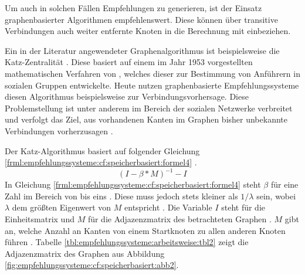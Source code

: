 Um auch in solchen Fällen Empfehlungen zu generieren, ist der Einsatz graphenbasierter Algorithmen empfehlenswert. Diese können über transitive Verbindungen auch weiter entfernte Knoten in die Berechnung mit einbeziehen. \cite[S. 60f.]{recommenderSystems:2016}

Ein in der Literatur angewendeter Graphenalgorithmus ist beispielsweise die Katz-Zentralität \cite[S. 4ff.]{guns:2014}\cite[S. 1ff.]{zhan:2017}. Diese basiert auf einem im Jahr 1953 vorgestellten mathematischen Verfahren von \textcite[S. 1ff.]{katz:1953}, welches dieser zur Bestimmung von Anführern in sozialen Gruppen entwickelte. Heute nutzen graphenbasierte Empfehlungssysteme diesen Algorithmus beispielsweise zur Verbindungsvorhersage. Diese Problemstellung ist unter anderem im Bereich der sozialen Netzwerke verbreitet und verfolgt das Ziel, aus vorhandenen Kanten im Graphen bisher unbekannte Verbindungen vorherzusagen \cite[S. 326ff.]{recommenderSystems:2016}\cite[S. 1ff.]{libenNowell:2007}.

Der Katz-Algorithmus basiert auf folgender Gleichung \ref{frml:empfehlungssysteme:cf:speicherbasiert:formel4} \cite[S. 62f.]{recommenderSystems:2016}\cite[S. 4]{libenNowell:2007}.
\begin{equation}
	(I - \beta * M)^{-1} - I
	\label{frml:empfehlungssysteme:cf:speicherbasiert:formel4}
\end{equation}
In Gleichung \ref{frml:empfehlungssysteme:cf:speicherbasiert:formel4} steht $\beta$ für eine Zahl im Bereich von \nullWert bis eins \cite[S. 6]{guns:2014}. Diese muss jedoch stets kleiner als $1/\lambda$ sein, wobei $\lambda$ dem größten Eigenwert von $M$ entspricht \cite[S. 6]{zhan:2017}. Die Variable $I$ steht für die Einheitsmatrix und $M$ für die Adjazenzmatrix des betrachteten Graphen \cite[S. 4]{libenNowell:2007}\cite[S. 2]{zhang:2015}. $M$ gibt an, welche Anzahl an Kanten von einem Startknoten zu allen anderen Knoten führen \cite[S. 6]{guns:2014}. Tabelle \ref{tbl:empfehlungssysteme:arbeitsweise:tbl2} zeigt die Adjazenzmatrix des Graphen aus Abbildung \ref{fig:empfehlungssysteme:cf:speicherbasiert:abb2}.

